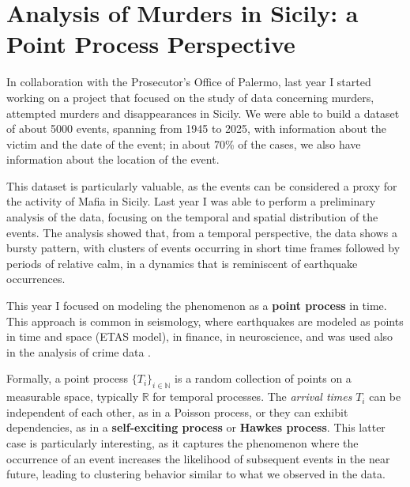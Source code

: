 \section{Analysis of Murders in Sicily: a Point Process Perspective}

In collaboration with the Prosecutor's Office of Palermo, last year I started working on a project that focused on the study of data concerning murders, attempted murders and disappearances in Sicily. We were able to build a dataset of about 5000 events, spanning from 1945 to 2025, with information about the victim and the date of the event; in about 70\% of the cases, we also have information about the location of the event.

This dataset is particularly valuable, as the events can be considered a proxy for the activity of Mafia in Sicily. Last year I was able to perform a preliminary analysis of the data, focusing on the temporal and spatial distribution of the events. The analysis showed that, from a temporal perspective, the data shows a bursty pattern, with clusters of events occurring in short time frames followed by periods of relative calm, in a dynamics that is reminiscent of earthquake occurrences.

This year I focused on modeling the phenomenon as a \textbf{point process} in time. This approach is common in seismology, where earthquakes are modeled as points in time and space (ETAS model), in finance, in neuroscience, and was used also in the analysis of crime data \cite{mohlerSelfExcitingPointProcess2011,bacryHawkesProcessesFinance2015,laubElementsHawkesProcesses2021}.

Formally, a point process $\{T_i\}_{i \in \mathbb{N}}$ is a random collection of points on a measurable space, typically $\mathbb{R}$ for temporal processes. The \textit{arrival times} $T_i$ can be independent of each other, as in a Poisson process, or they can exhibit dependencies, as in a \textbf{self-exciting process} or \textbf{Hawkes process}. This latter case is particularly interesting, as it captures the phenomenon where the occurrence of an event increases the likelihood of subsequent events in the near future, leading to clustering behavior similar to what we observed in the data.

